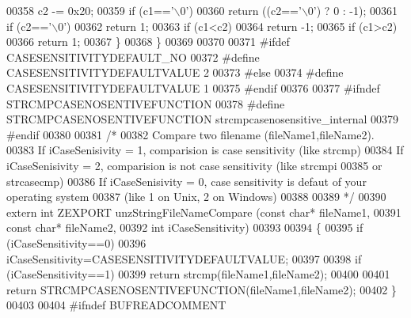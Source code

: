 \begin{DoxyCode}
00358             c2 -= 0x20;
00359         \textcolor{keywordflow}{if} (c1==\textcolor{charliteral}{'\(\backslash\)0'})
00360             \textcolor{keywordflow}{return} ((c2==\textcolor{charliteral}{'\(\backslash\)0'}) ? 0 : -1);
00361         \textcolor{keywordflow}{if} (c2==\textcolor{charliteral}{'\(\backslash\)0'})
00362             \textcolor{keywordflow}{return} 1;
00363         \textcolor{keywordflow}{if} (c1<c2)
00364             \textcolor{keywordflow}{return} -1;
00365         \textcolor{keywordflow}{if} (c1>c2)
00366             \textcolor{keywordflow}{return} 1;
00367     \}
00368 \}
00369 
00370 
00371 \textcolor{preprocessor}{#ifdef  CASESENSITIVITYDEFAULT\_NO}
00372 \textcolor{preprocessor}{#define CASESENSITIVITYDEFAULTVALUE 2}
00373 \textcolor{preprocessor}{#else}
00374 \textcolor{preprocessor}{#define CASESENSITIVITYDEFAULTVALUE 1}
00375 \textcolor{preprocessor}{#endif}
00376 
00377 \textcolor{preprocessor}{#ifndef STRCMPCASENOSENTIVEFUNCTION}
00378 \textcolor{preprocessor}{#define STRCMPCASENOSENTIVEFUNCTION strcmpcasenosensitive\_internal}
00379 \textcolor{preprocessor}{#endif}
00380 
00381 \textcolor{comment}{/*}
00382 \textcolor{comment}{   Compare two filename (fileName1,fileName2).}
00383 \textcolor{comment}{   If iCaseSenisivity = 1, comparision is case sensitivity (like strcmp)}
00384 \textcolor{comment}{   If iCaseSenisivity = 2, comparision is not case sensitivity (like strcmpi}
00385 \textcolor{comment}{                                                                or strcasecmp)}
00386 \textcolor{comment}{   If iCaseSenisivity = 0, case sensitivity is defaut of your operating system}
00387 \textcolor{comment}{        (like 1 on Unix, 2 on Windows)}
00388 \textcolor{comment}{}
00389 \textcolor{comment}{*/}
00390 \textcolor{keyword}{extern} \textcolor{keywordtype}{int} ZEXPORT unzStringFileNameCompare (\textcolor{keyword}{const} \textcolor{keywordtype}{char}*  fileName1,
00391                                                  \textcolor{keyword}{const} \textcolor{keywordtype}{char}*  fileName2,
00392                                                  \textcolor{keywordtype}{int} iCaseSensitivity)
00393 
00394 \{
00395     \textcolor{keywordflow}{if} (iCaseSensitivity==0)
00396         iCaseSensitivity=CASESENSITIVITYDEFAULTVALUE;
00397 
00398     \textcolor{keywordflow}{if} (iCaseSensitivity==1)
00399         \textcolor{keywordflow}{return} strcmp(fileName1,fileName2);
00400 
00401     \textcolor{keywordflow}{return} STRCMPCASENOSENTIVEFUNCTION(fileName1,fileName2);
00402 \}
00403 
00404 \textcolor{preprocessor}{#ifndef BUFREADCOMMENT}

\end{DoxyCode}
